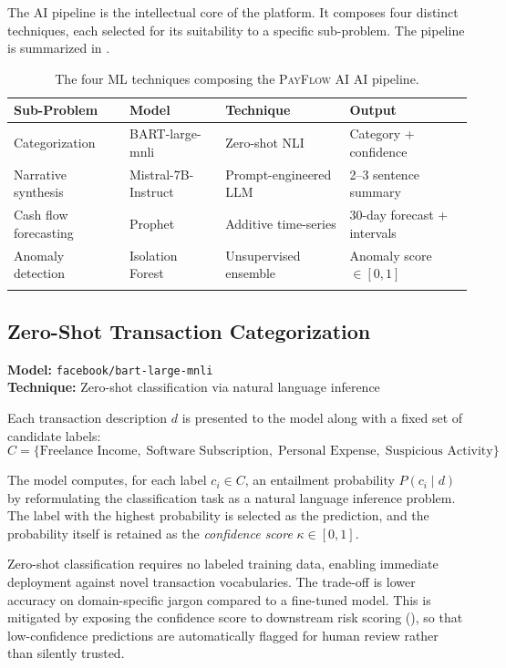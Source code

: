 \documentclass[11pt,a4paper]{article}
\newcommand{\payflow}{\textsc{PayFlow AI}}
\newcommand{\confidence}{\kappa}
\begin{document}
The AI pipeline is the intellectual core of the platform. It composes four distinct techniques, each selected for its suitability to a specific sub-problem. The pipeline is summarized in .

\begin{table}[ht]
  \centering
  \begin{tabular}{p{3.5cm}p{3.5cm}p{3cm}p{3.5cm}}
  \toprule
  \textbf{Sub-Problem} & \textbf{Model} & \textbf{Technique} & \textbf{Output} \\
  \midrule
  Categorization & BART-large-mnli & Zero-shot NLI & Category + confidence \\
  Narrative synthesis & Mistral-7B-Instruct & Prompt-engineered LLM & 2--3 sentence summary \\
  Cash flow forecasting & Prophet & Additive time-series & 30-day forecast + intervals \\
  Anomaly detection & Isolation Forest & Unsupervised ensemble & Anomaly score $\in [0,1]$ \\
  \bottomrule
  \caption{The four ML techniques composing the \payflow{} AI pipeline.}
  \label{tab:ml-techniques}
  \end{tabular}
\end{table}

\subsection{Zero-Shot Transaction Categorization}
\label{subsec:zero-shot}

\textbf{Model:} \texttt{facebook/bart-large-mnli} \\
\textbf{Technique:} Zero-shot classification via natural language inference

Each transaction description $d$ is presented to the model along with a fixed set of candidate labels:
\begin{equation}
  C = \{\text{Freelance Income},\; \text{Software Subscription},\; \text{Personal Expense},\; \text{Suspicious Activity}\}
\end{equation}

The model computes, for each label $c_i \in C$, an entailment probability $P(c_i \mid d)$ by reformulating the classification task as a natural language inference problem. The label with the highest probability is selected as the prediction, and the probability itself is retained as the \emph{confidence score} $\confidence \in [0, 1]$.

\begin{definitionbox}
Zero-shot classification requires no labeled training data, enabling immediate deployment against novel transaction vocabularies. The trade-off is lower accuracy on domain-specific jargon compared to a fine-tuned model. This is mitigated by exposing the confidence score to downstream risk scoring (), so that low-confidence predictions are automatically flagged for human review rather than silently trusted.
\end{definitionbox}
\end{document}
